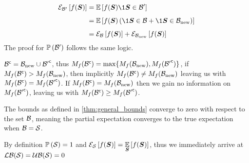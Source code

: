\begin{proofE}
	\begin{align*}
		\partialexpectation{f(\RV)}{\subSpace^\prime} & =\expectation{f(\RV)\1{\RV\in\subSpace^\prime}}{}\\
		& =\expectation{f(\RV)\left(\1{\RV\in\subSpace}+\1{\RV\in\subSpace_{\textrm{\textup{new}}}}\right)}{}\\
		& =\partialexpectation{f(\RV)}{\subSpace}+\partialexpectation{f(\RV)}{\subSpace_{\textrm{\textup{new}}}}
	\end{align*}
	The proof for $\mathbb{P}\left({\mathcal B^\prime}\right)$ follows the same logic.

	$\stcomp{\subSpace}=\subSpace_{\textrm{\textup{new}}}\cup\stcomp{\subSpace^\prime}$, thus $M_f({\mathcal B}^{\mathsf{c}})=\max\{M_f(\mathcal B_{\textrm{\textup{new}}}),M_f({\mathcal B^\prime}^{\mathsf{c}})\}$, if $M_f({\mathcal B}^{\mathsf{c}})>M_f(\mathcal B_{\textrm{\textup{new}}})$, then implicitly $M_f({\mathcal B}^{\mathsf{c}})\neq M_f(\mathcal B_{\textrm{\textup{new}}})$ leaving us with $M_f({\mathcal B}^{\mathsf{c}})=M_f({\mathcal B^\prime}^{\mathsf{c}})$. If $M_f({\mathcal B}^{\mathsf{c}})=M_f(\mathcal B_{\textrm{\textup{new}}})$ then we gain no information on $M_f({\mathcal B^\prime}^{\mathsf{c}})$, leaving us with $M_f({\mathcal B}^{\mathsf{c}})\geq M_f({\mathcal B^\prime}^{\mathsf{c}})$.
\end{proofE}


\begin{corollaryE}
	\label{thm:convergence}
	The bounds as defined in \cref{thm:general_bounds} converge to zero with respect to the set $\mathcal B$, meaning the partial expectation converges to the true expectation when $\mathcal B=\mathcal S$.
\end{corollaryE}
\begin{proofE}
	By definition $\mathbb{P}\left({\mathcal S}\right)=1$ and $\mathcal{E}_{\mathcal S}\left[{f(\boldsymbol S)}\right]=\operatorname*{\mathbb{E}}\limits_{\boldsymbol S}\left[{f(\boldsymbol S)}\right]$, thus we immediately arrive at $\operatorname*{\mathcal{LB}}(\mathcal S)=\operatorname*{\mathcal{UB}}(\mathcal S)=0$
\end{proofE}

